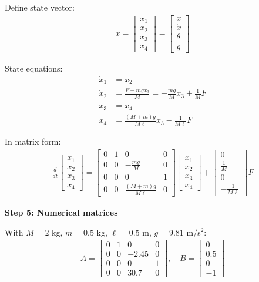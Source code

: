 \documentclass[11pt,a4paper]{article}
\begin{document}
Define state vector:
\begin{align}
x = \begin{bmatrix} x_1 \\ x_2 \\ x_3 \\ x_4 \end{bmatrix} = \begin{bmatrix} x \\ \dot{x} \\ \theta \\ \dot{\theta} \end{bmatrix}
\end{align}

State equations:
\begin{align}
\dot{x}_1 &= x_2 \\
\dot{x}_2 &= \frac{F - mg x_3}{M} = -\frac{mg}{M}x_3 + \frac{1}{M}F \\
\dot{x}_3 &= x_4 \\
\dot{x}_4 &= \frac{(M+m)g}{M\ell}x_3 - \frac{1}{M\ell}F
\end{align}

In matrix form:
\begin{align}
\frac{d}{dt}\begin{bmatrix} x_1 \\ x_2 \\ x_3 \\ x_4 \end{bmatrix} = \begin{bmatrix} 0 & 1 & 0 & 0 \\ 0 & 0 & -\frac{mg}{M} & 0 \\ 0 & 0 & 0 & 1 \\ 0 & 0 & \frac{(M+m)g}{M\ell} & 0 \end{bmatrix}\begin{bmatrix} x_1 \\ x_2 \\ x_3 \\ x_4 \end{bmatrix} + \begin{bmatrix} 0 \\ \frac{1}{M} \\ 0 \\ -\frac{1}{M\ell} \end{bmatrix}F
\end{align}

\textbf{Step 5: Numerical matrices}

With $M = 2$ kg, $m = 0.5$ kg, $\ell = 0.5$ m, $g = 9.81$ m/s$^2$:
\begin{align}
A = \begin{bmatrix} 0 & 1 & 0 & 0 \\ 0 & 0 & -2.45 & 0 \\ 0 & 0 & 0 & 1 \\ 0 & 0 & 30.7 & 0 \end{bmatrix}, \quad B = \begin{bmatrix} 0 \\ 0.5 \\ 0 \\ -1 \end{bmatrix}
\end{align}
\end{document}

